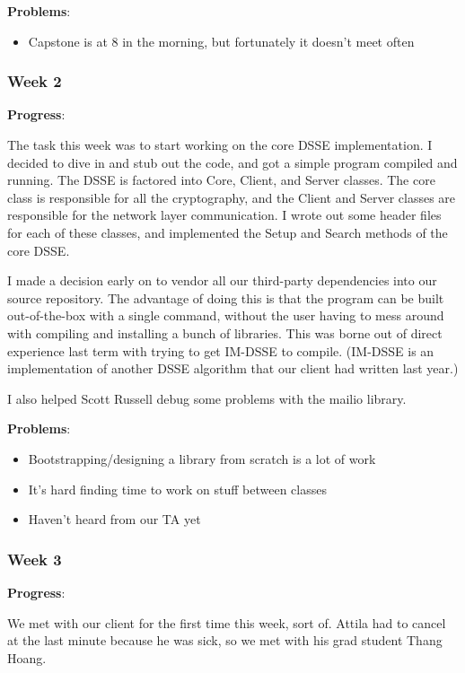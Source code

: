 \noindent \textbf{Problems}:
\begin{itemize}
\item Capstone is at 8 in the morning, but fortunately it doesn't meet often
\end{itemize}

\subsubsection{Week 2}

\noindent \textbf{Progress}:

The task this week was to start working on the core DSSE implementation. I decided to dive in and stub out the code, and got a simple program compiled and running. The DSSE is factored into Core, Client, and Server classes. The core class is responsible for all the cryptography, and the Client and Server classes are responsible for the network layer communication. I wrote out some header files for each of these classes, and implemented the Setup and Search methods of the core DSSE.

I made a decision early on to vendor all our third-party dependencies into our source repository. The advantage of doing this is that the program can be built out-of-the-box with a single command, without the user having to mess around with compiling and installing a bunch of libraries. This was borne out of direct experience last term with trying to get IM-DSSE to compile. (IM-DSSE is an implementation of another DSSE algorithm that our client had written last year.)

I also helped Scott Russell debug some problems with the mailio library.

\noindent \textbf{Problems}:
\begin{itemize}
  \item Bootstrapping/designing a library from scratch is a lot of work 
  \item It's hard finding time to work on stuff between classes 
  \item Haven't heard from our TA yet
\end{itemize}

\subsubsection{Week 3}

\noindent \textbf{Progress}:

We met with our client for the first time this week, sort of. Attila had to cancel at the last minute because he was sick, so we met with his grad student Thang Hoang.

